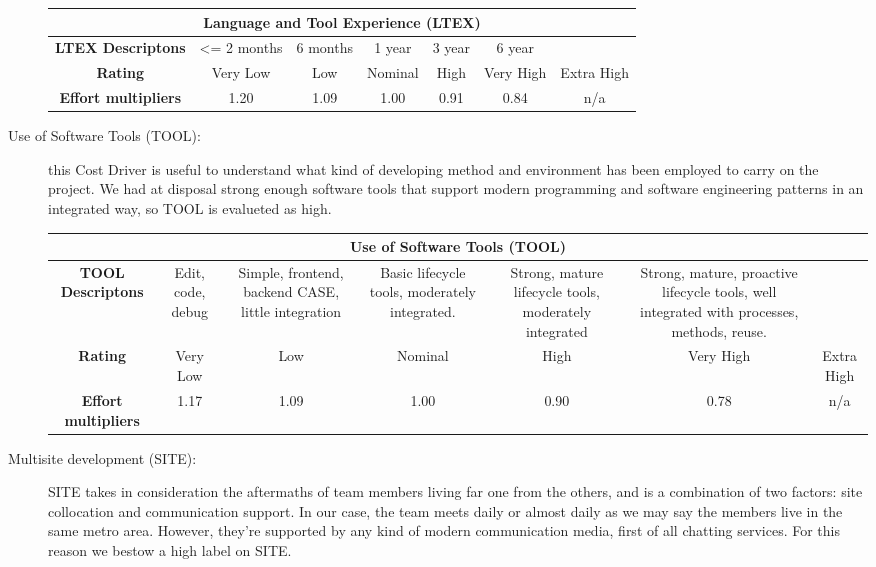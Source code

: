 \begin{description}
\begin{tabular}{ | c | c | c | c | c | c | c | }
\hline
         \multicolumn{7}{|c|}{\textbf{Language and Tool Experience (LTEX)}} \\ \hline  \hline
         	\textbf{LTEX Descriptons} & <= 2 months & 6 months &1 year & 3 year& 6 year&\\ \hline
	\textbf{Rating}&Very Low & Low & Nominal  & High & Very High &Extra High\\ \hline
	\textbf{Effort multipliers} & 1.20 & 1.09 & 1.00 & 0.91 & 0.84 & n/a \\ \hline
\end{tabular}

\item[Use of Software Tools (TOOL):] this Cost Driver is useful to understand what kind of developing method and environment has been employed to carry on the project. We had at disposal strong enough software tools that support modern programming and software engineering patterns in an integrated way, so TOOL is evalueted as high.

\begin{tabular}{ | c | c | c | c | c | c | c | }
\hline
         \multicolumn{7}{|c|}{\textbf{Use of Software Tools (TOOL)}} \\ \hline  \hline
         	\textbf{TOOL Descriptons} &Edit, code, debug &Simple, frontend, backend CASE, little integration & Basic lifecycle tools, moderately integrated.& Strong, mature lifecycle tools, moderately integrated & Strong, mature, proactive lifecycle tools, well integrated with processes, methods, reuse.&\\ \hline
	\textbf{Rating}&Very Low & Low & Nominal  & High & Very High &Extra High\\ \hline
	\textbf{Effort multipliers} & 1.17 & 1.09 & 1.00 & 0.90 & 0.78 & n/a \\ \hline
\end{tabular}

\item[Multisite development (SITE):]  SITE takes in consideration the aftermaths of team members living far one from the others, and is a combination of two factors: site collocation and communication support. In our case, the team meets daily or almost daily as we may say the members live in the same metro area. However, they're supported by any kind of modern communication media, first of all chatting services. For this reason we bestow a high label on SITE.



\end{description}
